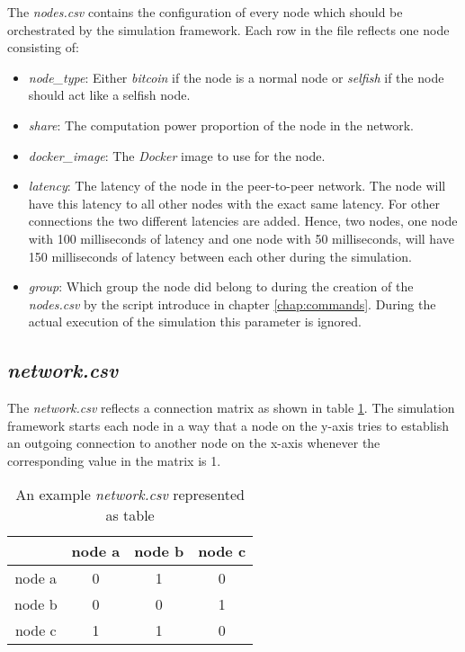 The \textit{nodes.csv} contains the configuration of every node which should be orchestrated by the simulation framework.
Each row in the file reflects one node consisting of:
\begin{itemize}
	\item \textit{node\_type}: Either \textit{bitcoin} if the node is a normal node or \textit{selfish} if the node should act like a selfish node.
	\item \textit{share}: The computation power proportion of the node in the network.
	\item \textit{docker\_image}: The \textit{Docker} image to use for the node.
	\item \textit{latency}: The latency  of the node in the peer-to-peer network.
	The node will have this latency to all other nodes with the exact same latency.
	For other connections the two different latencies are added.
	Hence, two nodes, one node with 100 milliseconds of latency and one node with 50 milliseconds, will have 150 milliseconds of latency between each other during the simulation.
	\item \textit{group}: Which group the node did belong to during the creation of the \textit{nodes.csv} by the script introduce in chapter \ref{chap:commands}.
	During the actual execution of the simulation this parameter is ignored.
\end{itemize}
 
\subsection{\textit{network.csv}}
The \textit{network.csv} reflects a connection matrix as shown in table \ref{tab:network_csv}.
The simulation framework starts each node in a way that a node on the y-axis tries to establish an outgoing connection to another node on the x-axis whenever the corresponding value in the matrix is 1.

\begin{table}
  \centering
  \begin{tabular}{c|ccc}
    			& node a 	& node b	& node c	\\
    \hline
    node a		& 0			& 1         & 0         \\
    node b      & 0         & 0         & 1			\\
    node c      & 1         & 1			& 0         \\
  \end{tabular}
  \caption{An example \textit{network.csv} represented as table}
  \label{tab:network_csv}
\end{table}

